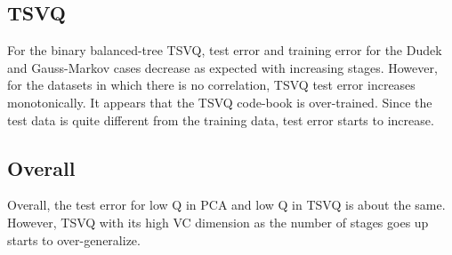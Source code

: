\subsection{TSVQ}
For the binary balanced-tree TSVQ, test error and training error for the Dudek and Gauss-Markov cases decrease as expected with increasing stages.  However, for the datasets in which there is no correlation, TSVQ test error increases monotonically.  It appears that the TSVQ code-book is over-trained.  Since the test data is quite different from the training data, test error starts to increase.  

\subsection{Overall}
Overall, the test error for low Q in PCA and low Q in TSVQ is about the same.  However, TSVQ with its high VC dimension as the number of stages goes up starts to over-generalize.

\normalsize


